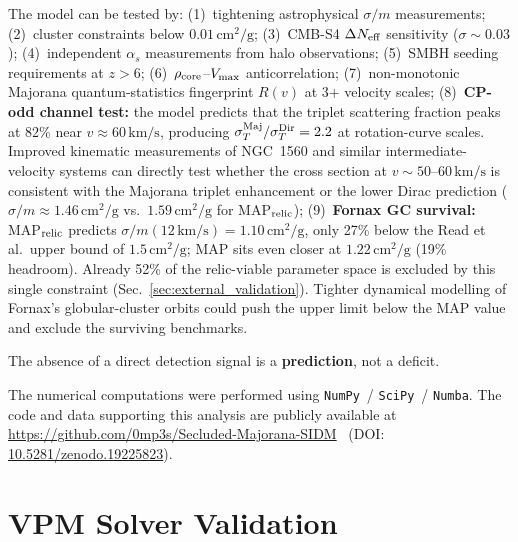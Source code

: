 \documentclass[aps,prd,twocolumn,superscriptaddress,nofootinbib]{revtex4-2}
\newcommand{\sigmam}{\sigma/m}
\newcommand{\kms}{\,\text{km/s}}
\newcommand{\cmg}{\,\text{cm}^2/\text{g}}
\newcommand{\Neff}{\Delta N_{\rm eff}}
\begin{document}
The model can be tested by:
(1)~tightening astrophysical $\sigmam$ measurements;
(2)~cluster constraints below $0.01\cmg$;
(3)~CMB-S4 $\Neff$ sensitivity ($\sigma\sim 0.03$);
(4)~independent $\alpha_s$ measurements from halo observations;
(5)~SMBH seeding requirements at $z>6$;
(6)~$\rho_{\rm core}$--$V_{\rm max}$ anticorrelation;
(7)~non-monotonic Majorana quantum-statistics fingerprint
$R(v)$ at 3+ velocity scales;
(8)~\textbf{CP-odd channel test:} the model predicts that the
triplet scattering fraction peaks at $82\%$ near $v\approx 60\kms$,
producing $\sigma_T^{\rm Maj}/\sigma_T^{\rm Dir}=2.2$ at
rotation-curve scales.  Improved kinematic measurements of
NGC~1560 and similar intermediate-velocity systems can directly
test whether the cross section at $v\sim 50$--$60\kms$ is
consistent with the Majorana triplet enhancement or the lower
Dirac prediction ($\sigmam \approx 1.46\cmg$ vs.\ $1.59\cmg$
for MAP$_{\rm relic}$);
(9)~\textbf{Fornax GC survival:} MAP$_{\rm relic}$ predicts
$\sigmam(12\kms)=1.10\cmg$, only 27\% below the Read et al.\
upper bound of $1.5\cmg$; MAP sits even closer at $1.22\cmg$
(19\% headroom).  Already 52\% of the relic-viable parameter space
is excluded by this single constraint (Sec.~\ref{sec:external_validation}).
Tighter dynamical modelling of Fornax's
globular-cluster orbits could push the upper limit below the MAP value
and exclude the surviving benchmarks.

The absence of a direct detection signal is a \textbf{prediction},
not a deficit.

\begin{acknowledgments}
The numerical computations were performed using
\texttt{NumPy}~/ \texttt{SciPy}~/ \texttt{Numba}.
The code and data supporting this analysis are publicly available at
\url{https://github.com/0mp3s/Secluded-Majorana-SIDM}~\cite{SIDM_code:2026}
(DOI: \href{https://doi.org/10.5281/zenodo.19225823}{10.5281/zenodo.19225823}).
\end{acknowledgments}


\appendix

\section{VPM Solver Validation}\label{app:validation}
\end{document}
